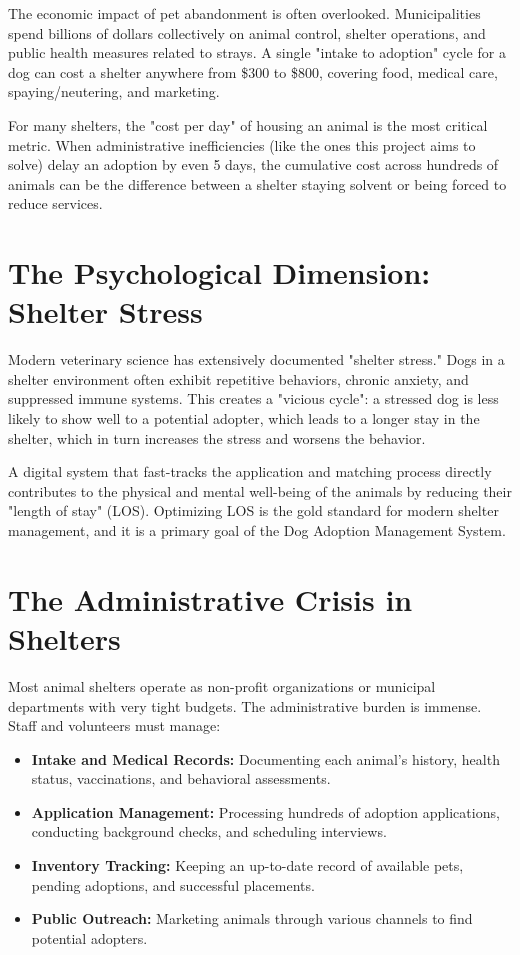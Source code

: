 The economic impact of pet abandonment is often overlooked. Municipalities spend billions of dollars collectively on animal control, shelter operations, and public health measures related to strays. A single "intake to adoption" cycle for a dog can cost a shelter anywhere from \$300 to \$800, covering food, medical care, spaying/neutering, and marketing.

For many shelters, the "cost per day" of housing an animal is the most critical metric. When administrative inefficiencies (like the ones this project aims to solve) delay an adoption by even 5 days, the cumulative cost across hundreds of animals can be the difference between a shelter staying solvent or being forced to reduce services.

\section{The Psychological Dimension: Shelter Stress}

Modern veterinary science has extensively documented "shelter stress." Dogs in a shelter environment often exhibit repetitive behaviors, chronic anxiety, and suppressed immune systems. This creates a "vicious cycle": a stressed dog is less likely to show well to a potential adopter, which leads to a longer stay in the shelter, which in turn increases the stress and worsens the behavior.

A digital system that fast-tracks the application and matching process directly contributes to the physical and mental well-being of the animals by reducing their "length of stay" (LOS). Optimizing LOS is the gold standard for modern shelter management, and it is a primary goal of the Dog Adoption Management System.

\section{The Administrative Crisis in Shelters}

Most animal shelters operate as non-profit organizations or municipal departments with very tight budgets. The administrative burden is immense. Staff and volunteers must manage:
\begin{itemize}
    \item \textbf{Intake and Medical Records:} Documenting each animal's history, health status, vaccinations, and behavioral assessments.
    \item \textbf{Application Management:} Processing hundreds of adoption applications, conducting background checks, and scheduling interviews.
    \item \textbf{Inventory Tracking:} Keeping an up-to-date record of available pets, pending adoptions, and successful placements.
    \item \textbf{Public Outreach:} Marketing animals through various channels to find potential adopters.
\end{itemize}

